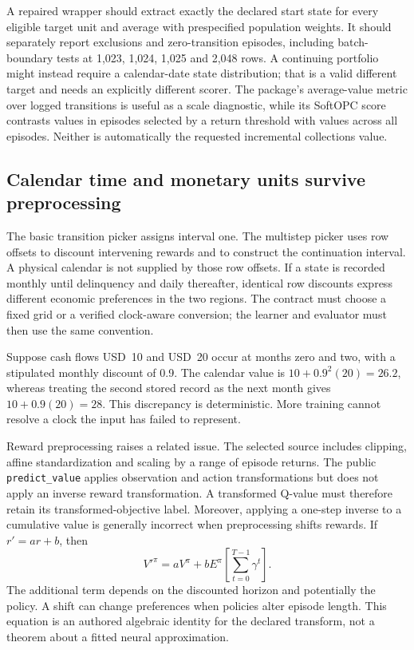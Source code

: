 A repaired wrapper should extract exactly the declared start state for every
eligible target unit and average with prespecified population weights. It
should separately report exclusions and zero-transition episodes, including
batch-boundary tests at 1,023, 1,024, 1,025 and 2,048 rows. A continuing
portfolio might instead require a calendar-date state distribution; that is
a valid different target and needs an explicitly different scorer. The
package's average-value metric over logged transitions is useful as a scale
diagnostic, while its SoftOPC score contrasts values in episodes selected by
a return threshold with values across all episodes. Neither is automatically
the requested incremental collections value.
\citep{exec15_d3rlpy_value,exec15_d3rlpy_contract}

\subsection{Calendar time and monetary units survive preprocessing}

The basic transition picker assigns interval one. The multistep picker uses
row offsets to discount intervening rewards and to construct the continuation
interval. A physical calendar is not supplied by those row offsets. If a
state is recorded monthly until delinquency and daily thereafter, identical
row discounts express different economic preferences in the two regions.
The contract must choose a fixed grid or a verified clock-aware conversion;
the learner and evaluator must then use the same convention.
\citep{exec15_d3rlpy_episode,exec15_d3rlpy_contract}

Suppose cash flows USD~10 and USD~20 occur at months zero and two, with a
stipulated monthly discount of 0.9. The calendar value is
\(10+0.9^2(20)=26.2\), whereas treating the second stored record as the next
month gives \(10+0.9(20)=28\). This discrepancy is deterministic. More
training cannot resolve a clock the input has failed to represent.
\citep{exec15_d3rlpy_exact}

Reward preprocessing raises a related issue. The selected source includes
clipping, affine standardization and scaling by a range of episode returns.
The public \texttt{predict_value} applies observation and action
transformations but does not apply an inverse reward transformation.
A transformed Q-value must therefore retain its transformed-objective label.
Moreover, applying a one-step inverse to a cumulative value is generally
incorrect when preprocessing shifts rewards. If \(r'=a r+b\), then
\[
 V'^{\pi}=a V^{\pi}+b E^{\pi}
                 \left[\sum_{t=0}^{T-1}\gamma^t\right].
\]
The additional term depends on the discounted horizon and potentially the
policy. A shift can change preferences when policies alter episode length.
This equation is an authored algebraic identity for the declared transform,
not a theorem about a fitted neural approximation.
\citep{exec15_d3rlpy_value,exec15_d3rlpy_exact}

